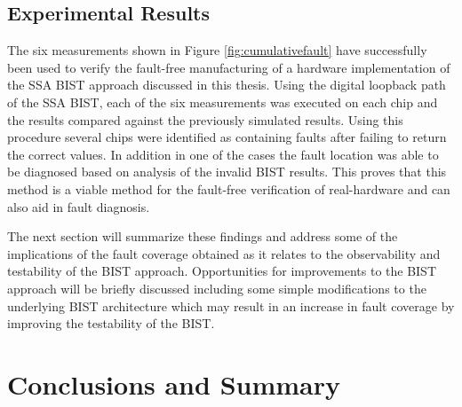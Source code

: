 \documentclass[12pt]{report}
\begin{document}
\section{Experimental Results}
The six measurements shown in Figure \ref{fig:cumulativefault} have successfully been used to verify the fault-free manufacturing of a hardware implementation of the SSA BIST approach discussed in this thesis.  Using the digital loopback path of the SSA BIST, each of the six measurements was executed on each chip and the results compared against the previously simulated results.  Using this procedure several chips were identified as containing faults after failing to return the correct values.  In addition in one of the cases the fault location was able to be diagnosed based on analysis of the invalid BIST results.  This proves that this method is a viable method for the fault-free verification of real-hardware and can also aid in fault diagnosis.

The next section will summarize these findings and address some of the implications of the fault coverage obtained as it relates to the observability and testability of the BIST approach.  Opportunities for improvements to the BIST approach will be briefly discussed including some simple modifications to the underlying BIST architecture which may result in an increase in fault coverage by improving the testability of the BIST.

\chapter{Conclusions and Summary}
\end{document}
